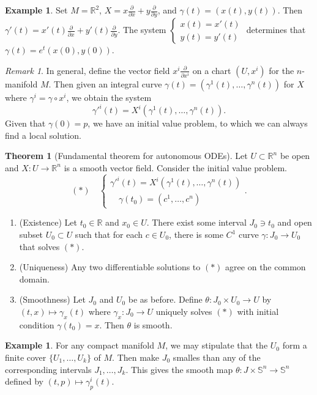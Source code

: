 \documentclass[10pt,letterpaper,cm]{nupset}
\theoremstyle{definition}
\newtheorem{exmp}[definition]{Example}
\theoremstyle{theorem}
\newtheorem{theorem}[definition]{Theorem}
\theoremstyle{remark}
\newtheorem{remark}[definition]{Remark}
\newcommand{\R}{\mathbb R}
\renewcommand{\S}{\mathbb S}
\newcommand{\1}{\mathbf{1}}
\newcommand{\0}{\vec 0}
\begin{document}
\begin{exmp}
Set $M= \R^2$, $X = x\frac{\partial}{\partial{x}} + y \frac{\partial}{\partial{y}}$, and $\gamma(t) = (x(t), y(t))$. Then $\gamma'(t) = x'(t)\frac{\partial}{\partial{x}}  + y'(t)\frac{\partial}{\partial{y}}$.  The system $\begin{cases} x(t) = x'(t) \\ y(t) = y'(t) \end{cases}$ determines that 
$\gamma(t) = e^t(x(0), y(0))$.
\end{exmp}
\begin{remark}
In general, define the vector field $x^i\frac{\partial}{\partial{x^i}}$ on a chart $(U, x^i)$ for the $n$-manifold $M$. Then given an integral curve $\gamma(t) = (\gamma^1(t), \ldots, \gamma^n(t))$ for $X$ where $\gamma^i = \gamma \circ x^i$, we obtain the system $$ \gamma'^i(t) = X^i(\gamma^1(t), \ldots, \gamma^n(t)).  $$ Given that $\gamma(0) =p$, we have an initial value problem, to which we can always find a local solution.
\end{remark}

\begin{theorem}[Fundamental theorem for autonomous ODEs]
Let $U\subset \R^n$ be open and $X: U \to \R^n$ is a smooth vector field.  Consider the initial value problem.
$$(\ast) \quad \begin{cases} \gamma'^i(t) = X^i(\gamma^1(t), \ldots, \gamma^n(t)) \\ \quad  \gamma(t_0) =(c^1, \ldots, c^n) \end{cases}.$$ 
\begin{enumerate}
\item (Existence)  Let $t_0 \in \R$ and $x_0\in U$. There exist some interval $J_0 \ni t_0$ and open subset $U_0 \subset U$ such that for each $c\in U_0$, there is some $C^1$ curve $\gamma : J_0 \to U_0$ that solves  $(\ast)$.
\item (Uniqueness)  Any two differentiable solutions to $(\ast)$ agree on the common domain.
\item (Smoothness) Let $J_0$ and $U_0$ be as before. Define $\theta : J_0 \times U_0 \to U$ by $(t, x) \mapsto \gamma_x(t)$ where $\gamma_x : J_0 \to U$ uniquely solves $(\ast)$ with initial condition $\gamma(t_0) = x$. Then $\theta$ is smooth.
\end{enumerate}
\end{theorem}

\begin{exmp}
For any compact manifold $M$, we may stipulate that the $U_0$ form a finite cover $\{U_1, \ldots, U_k\}$ of $M$. Then make $J_0$ smalles than any of the corresponding intervals $J_1, \ldots, J_k$. This gives the smooth map $\theta : J \times \S^n \to \S^n$ defined by $(t, p) \mapsto \gamma_p^i(t)$.
\end{exmp}
\end{document}
